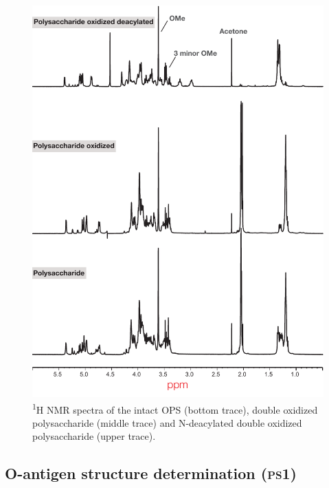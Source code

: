  \begin{figure}[ph] %
    \begin{center}
      \includegraphics[height=0.9\textheight]{lps_chapter/img/lpsfig1.pdf}
    \end{center}
    \caption[\textsuperscript{1}H \ac{NMR} spectra of \caulobacter{} \ac{OPS}]{\textsuperscript{1}H
      \ac{NMR} spectra of the intact \caulobacter{} \ac{OPS} (bottom trace), double oxidized
      polysaccharide (middle trace) and N-deacylated double oxidized polysaccharide (upper trace).}
    \label{fig:lpsfig1}
  \end{figure}

	\subsection{O-antigen structure determination (\textsc{ps}1)} %
	\label{sub:o_antigen_structure_determination_ps1_}

